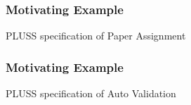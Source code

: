 \documentclass[xcolor=svgnames]{beamer}
\begin{document}
\begin{frame}
\frametitle{Motivating Example}
\begin{block}{PLUSS specification of Paper Assignment}
 \end{block} 
\end{frame}

\begin{frame}
\frametitle{Motivating Example}
\begin{block}{PLUSS specification of Auto Validation}
\end{block}
\end{frame}
\end{document}
